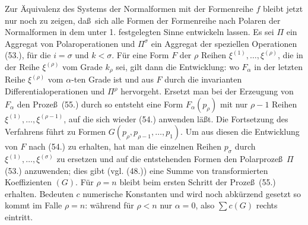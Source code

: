 Zur \"Aquivalenz des Systems der Normalformen mit der Formenreihe $f$ bleibt jetzt nur noch zu zeigen, da\ss\ sich alle Formen der Formenreihe nach Polaren der Normalformen in dem unter 1. festgelegten Sinne entwickeln lassen. Es sei $\Pi$ ein Aggregat von Polaroperationen
und $\Pi^\sigma$ ein Aggregat der speziellen Operationen (53.), f\"ur die $i=\sigma$ und $k<\sigma$. F\"ur eine Form $F$ der $\rho$ Reihen $\xi^{(1)},\ldots,\xi^{(\rho)}$, die in der Reihe $\xi^{(\rho)}$ vom Grade $k_\rho$ sei, gilt dann die Entwicklung:
wo $F_\alpha$ in der letzten Reihe $\xi^{(\rho)}$ vom $\alpha$-ten Grade ist und aus $F$ durch die invarianten Differentialoperationen
und $\Pi^\rho$ hervorgeht. Ersetzt man bei der Erzeugung von $F_\alpha$ den Proze\ss\ (55.) durch
so entsteht eine Form $F_\alpha(p_\rho)$ mit nur $\rho-1$ Reihen $\xi^{(1)},\ldots,\xi^{(\rho-1)}$, auf die sich wieder (54.) anwenden l\"a\ss t. Die Fortsetzung des Verfahrens f\"uhrt zu Formen $G(p_\rho,p_{\rho-1},\ldots,p_1)$. Um aus diesen die Entwicklung von $F$ nach (54.) zu erhalten, hat man die einzelnen Reihen $p_\sigma$ durch $\xi^{(1)},\ldots,\xi^{(\sigma)}$ zu ersetzen und auf die entstehenden Formen den Polarproze\ss\ $\Pi$ (53.) anzuwenden; dies gibt (vgl. (48.)) eine Summe von transformierten Koeffizienten $(G)$. F\"ur $\rho=n$ bleibt beim ersten Schritt der Proze\ss\ (55.) erhalten. Bedeuten $c$ numerische Konstanten und wird noch abk\"urzend gesetzt
so kommt im Falle $\rho=n$:
w\"ahrend f\"ur $\rho<n$ nur $\alpha=0$, also $\sum c(G)$ rechts eintritt.
